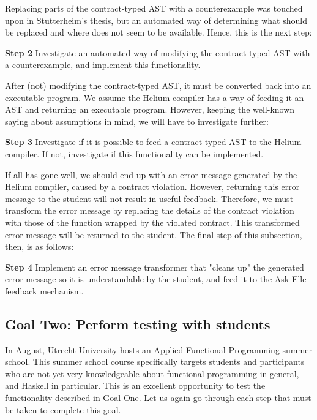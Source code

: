 \documentclass[10pt]{report}
\begin{document}
Replacing parts of the contract-typed AST with a counterexample was touched upon in Stutterheim's thesis, but an automated way of determining what should be replaced and where does not seem to be available.
Hence, this  is the next step:
\begin{description}
	\item{\textbf{Step 2}} Investigate an automated way of modifying the contract-typed AST with a counterexample, and implement this functionality.
\end{description}

After (not) modifying the contract-typed AST, it must be converted back into an executable program.
We assume the Helium-compiler has a way of feeding it an AST and returning an executable program.
However, keeping the well-known saying about assumptions in mind, we will have to investigate further:

\begin{description}
	\item{\textbf{Step 3}} Investigate if it is possible to feed a contract-typed AST to the Helium compiler. If not, investigate if this functionality can be implemented.
\end{description}

If all has gone well, we should end up with an error message generated by the Helium compiler, caused by a contract violation.
However, returning this error message to the student will not result in useful feedback.
Therefore, we must transform the error message by replacing the details of the contract violation with those of the function wrapped by the violated contract.
This transformed error message will be returned to the student. The final step of this subsection, then, is as follows:

\begin{description}
	\item{\textbf{Step 4}} Implement an error message transformer that "cleans up" the generated error message so it is understandable by the student, and feed it to the Ask-Elle feedback mechanism.
\end{description}

\subsection{Goal Two: Perform testing with students}

In August, Utrecht University hosts an Applied Functional Programming summer school.
This summer school course specifically targets students and participants who are not yet very knowledgeable about functional programming in general, and Haskell in particular.
This is an excellent opportunity to test the functionality described in Goal One.
Let us again go through each step that must be taken to complete this goal.
\end{document}
